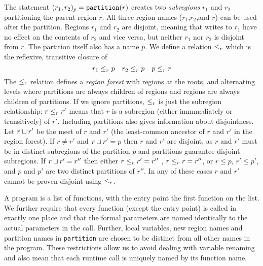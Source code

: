 The statement $(r_1, r_2)_{p} = \mbox{\tt partition}(r)$ creates two
{\em subregions} $r_1$ and $r_2$ partitioning the parent region $r$.
All three region names ($r_1$,$r_2$,and $r$) can be used after the
partition.  Regions $r_1$ and $r_2$ are disjoint, meaning that writes
to $r_1$ have no effect on the contents of $r_2$ and vice versa, but
neither $r_1$ nor $r_2$ is disjoint from $r$.  The partition itself
also has a name $p$.  We define a relation $\leq_r$ which is the
reflexive, transitive closure of
\[ r_1 \leq_r p \ \ \ r_2 \leq_r p \ \ \ p \leq_r r \]
The $\leq_r$ relation defines a {\em region forest} with regions at the
roots, and alternating levels where partitions are always children of
regions and regions are always children of partitions.  If we ignore
partitions, $\leq_r$ is just the subregion relationship: $r \leq_r r'$
means that $r$ is a subregion (either immmediately or transitively) of
$r'$.  Including partitions also gives information about disjointness.
Let $r \sqcup r'$ be the meet of $r$ and $r'$ (the least-common
ancestor of $r$ and $r'$ in the region forest).  If $r \neq r'$ and
$r \sqcup r' = p$ then $r$ and $r'$ are disjoint, as $r$ and $r'$ must
be in distinct subregions of the partition $p$ and partitions
guarantee disjoint subregions.  If $r \sqcup r' = r''$ then either $r
\leq_r r' = r''$ , $r \leq_r r = r''$, or $r \leq p$, $r' \leq p'$, and
$p$ and $p'$ are two distinct partitions of $r''$.  In any of these
cases $r$ and $r'$ cannot be proven disjoint using $\leq_r$.


A program is a list of functions, with the entry point the first
function on the list.  We further require that every function (except
the entry point) is called in exactly one place and that the formal
parameters are named identically to the actual parameters in the
call.  Further, local variables, new region names and
partition names in {\tt partition} are chosen to be distinct from all
other names in the program.  These restrictions allow us to avoid
dealing with variable renaming and also mean that each runtime call is
uniquely named by its function name.  

